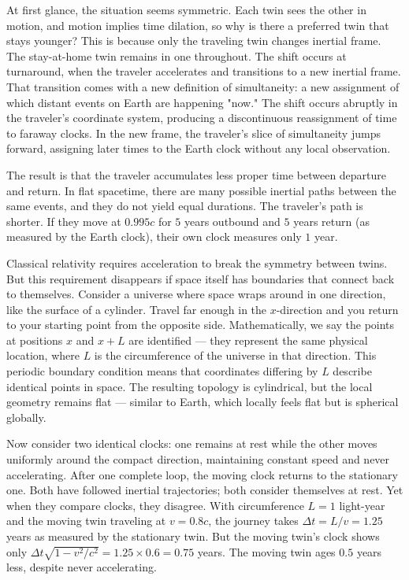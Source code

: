 At first glance, the situation seems symmetric. Each twin sees the other in motion, and motion implies time dilation, so why is there a preferred twin that stays younger? This is because only the traveling twin changes inertial frame. The stay-at-home twin remains in one throughout. The shift occurs at turnaround, when the traveler accelerates and transitions to a new inertial frame. That transition comes with a new definition of simultaneity: a new assignment of which distant events on Earth are happening "now." The shift occurs abruptly in the traveler's coordinate system, producing a discontinuous reassignment of time to faraway clocks. In the new frame, the traveler's slice of simultaneity jumps forward, assigning later times to the Earth clock without any local observation. 

The result is that the traveler accumulates less proper time between departure and return. In flat spacetime, there are many possible inertial paths between the same events, and they do not yield equal durations. The traveler's path is shorter. If they move at $0.995c$ for $5$ years outbound and $5$ years return (as measured by the Earth clock), their own clock measures only $1$ year. 

Classical relativity requires acceleration to break the symmetry between twins. But this requirement disappears if space itself has boundaries that connect back to themselves. Consider a universe where space wraps around in one direction, like the surface of a cylinder. Travel far enough in the $x$-direction and you return to your starting point from the opposite side. Mathematically, we say the points at positions $x$ and $x + L$ are identified — they represent the same physical location, where $L$ is the circumference of the universe in that direction. This periodic boundary condition means that coordinates differing by $L$ describe identical points in space. The resulting topology is cylindrical, but the local geometry remains flat — similar to Earth, which locally feels flat but is spherical globally.

Now consider two identical clocks: one remains at rest while the other moves uniformly around the compact direction, maintaining constant speed and never accelerating. After one complete loop, the moving clock returns to the stationary one. Both have followed inertial trajectories; both consider themselves at rest. Yet when they compare clocks, they disagree. With circumference $L = 1$ light-year and the moving twin traveling at $v = 0.8c$, the journey takes $\Delta t = L/v = 1.25$ years as measured by the stationary twin. But the moving twin's clock shows only $\Delta t \sqrt{1 - v^2/c^2} = 1.25 \times 0.6 = 0.75$ years. The moving twin ages $0.5$ years less, despite never accelerating.

